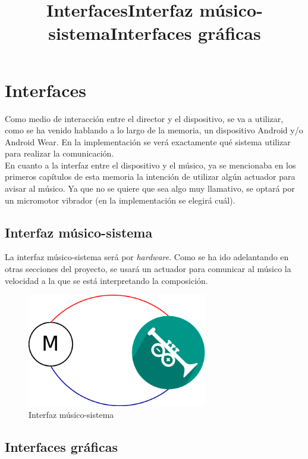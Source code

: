\section{Interfaces}
\title{Interfaces}

Como medio de interacción entre el director y el dispositivo, se va a utilizar,
como se ha venido hablando a lo largo de la memoria, un dispositivo Android y/o
Android Wear. En la implementación se verá exactamente qué sistema utilizar
para realizar la comunicación.\\

En cuanto a la interfaz entre el dispositivo y el músico, ya se mencionaba en
los primeros capítulos de esta memoria la intención de utilizar algún actuador
para avisar al músico. Ya que no se quiere que sea algo muy llamativo, se optará
por un micromotor vibrador (en la implementación se elegirá cuál).\\


\subsection{Interfaz músico-sistema}
\title{Interfaz músico-sistema}

La interfaz músico-sistema será por \textit{hardware}. Como se ha ido adelantando
en otras secciones del proyecto, se usará un actuador para comunicar al músico
la velocidad a la que se está interpretando la composición.\\

\begin{figure}[!htb]
\centering
\includegraphics[width=0.7\textwidth]{./imagenes/motorarduband}
\caption{Interfaz músico-sistema} \label{fig:motorarduband}
\end{figure}

\subsection{Interfaces gráficas}
\title{Interfaces gráficas}

